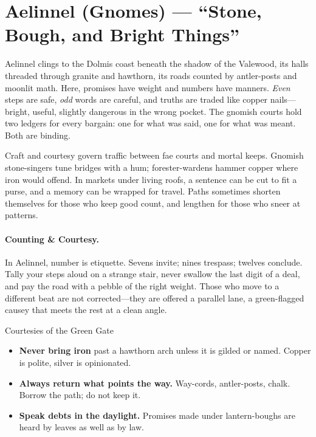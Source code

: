 \section{Aelinnel (Gnomes) --- ``Stone, Bough, and Bright Things''}
\label{chap:aelinnel}

Aelinnel clings to the Dolmis coast beneath the shadow of the Valewood, its halls threaded through granite and hawthorn, its roads counted by antler-posts and moonlit math. Here, promises have weight and numbers have manners. \emph{Even} steps are safe, \emph{odd} words are careful, and truths are traded like copper nails---bright, useful, slightly dangerous in the wrong pocket. The gnomish courts hold two ledgers for every bargain: one for what was said, one for what was meant. Both are binding.

Craft and courtesy govern traffic between  fae courts and mortal keeps. Gnomish stone-singers tune bridges with a hum; forester-wardens hammer copper where iron would offend. In markets under living roofs, a sentence can be cut to fit a purse, and a memory can be wrapped for travel. Paths sometimes shorten themselves for those who keep good count, and lengthen for those who sneer at patterns.

\paragraph{Counting \& Courtesy.} In Aelinnel, number is etiquette. Sevens invite; nines trespass; twelves conclude. Tally your steps aloud on a strange stair, never swallow the last digit of a deal, and pay the road with a pebble of the right weight. Those who move to a different beat are not corrected---they are offered a parallel lane, a green-flagged causey that meets the rest at a clean angle.

\begin{sidebar}{Courtesies of the Green Gate}
\begin{itemize}
\item \textbf{Never bring iron} past a hawthorn arch unless it is gilded or named. Copper is polite, silver is opinionated.
\item \textbf{Always return what points the way.} Way-cords, antler-posts, chalk. Borrow the path; do not keep it.
\item \textbf{Speak debts in the daylight.} Promises made under lantern-boughs are heard by leaves as well as by law.
\end{itemize}
\end{sidebar}


